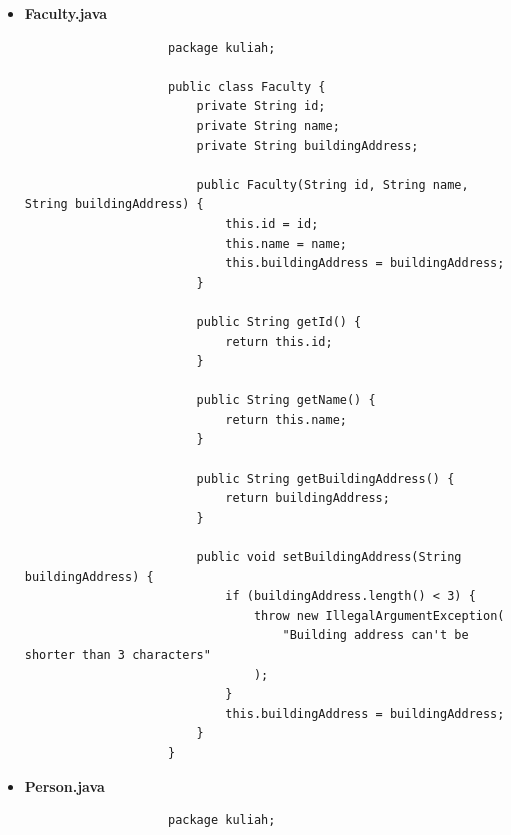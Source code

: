 \documentclass[12pt,titlepage]{article}
\begin{document}
\begin{itemize}
{\begin{itemize}
{\begin{verbatim}
                        Lecturer lecturer = new Lecturer(
                                "1234567890",
                                "Dosen",
                                "Something something",
                                fik
                        );
                        lecturer.addSubject(projectManagement);
                        lecturer.addSubject(oop);

                        lecturer.removeSubject("Project Management");

                        System.out.println("Subject for student: " + student.getName());
                        for (Subject subject : student.getSubjects()) {
                            System.out.println("Subject: " + subject.getName());
                        }
                        System.out.println("Student faculty: " + student.getFaculty());
                    }
                }
                \end{verbatim}
            }
            \item {
                \textbf{Faculty.java}
                \begin{verbatim}
                    package kuliah;

                    public class Faculty {
                        private String id;
                        private String name;
                        private String buildingAddress;

                        public Faculty(String id, String name, String buildingAddress) {
                            this.id = id;
                            this.name = name;
                            this.buildingAddress = buildingAddress;
                        }

                        public String getId() {
                            return this.id;
                        }

                        public String getName() {
                            return this.name;
                        }

                        public String getBuildingAddress() {
                            return buildingAddress;
                        }

                        public void setBuildingAddress(String buildingAddress) {
                            if (buildingAddress.length() < 3) {
                                throw new IllegalArgumentException(
                                    "Building address can't be shorter than 3 characters"
                                );
                            }
                            this.buildingAddress = buildingAddress;
                        }
                    }
                \end{verbatim}
            }
            \item {
                \textbf{Person.java}
                \begin{verbatim}
                    package kuliah;


\end{verbatim}}
\end{itemize}}
\end{itemize}
\end{document}
